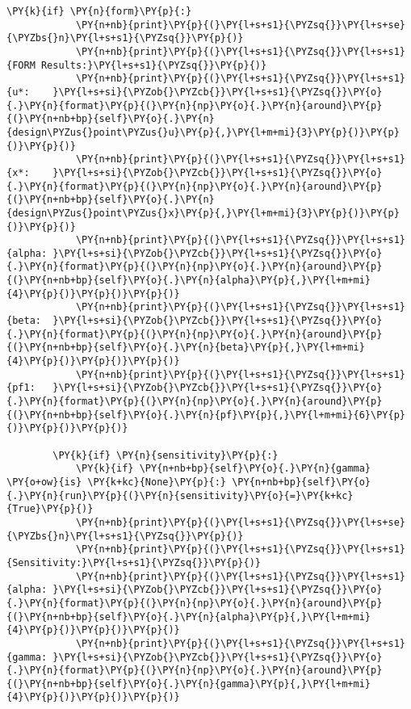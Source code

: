 \begin{tcolorbox}[breakable, size=fbox, boxrule=1pt, pad at break*=1mm,colback=cellbackground, colframe=cellborder]
\begin{Verbatim}[commandchars=\\\{\}]
        \PY{k}{if} \PY{n}{form}\PY{p}{:}
            \PY{n+nb}{print}\PY{p}{(}\PY{l+s+s1}{\PYZsq{}}\PY{l+s+se}{\PYZbs{}n}\PY{l+s+s1}{\PYZsq{}}\PY{p}{)}
            \PY{n+nb}{print}\PY{p}{(}\PY{l+s+s1}{\PYZsq{}}\PY{l+s+s1}{FORM Results:}\PY{l+s+s1}{\PYZsq{}}\PY{p}{)}
            \PY{n+nb}{print}\PY{p}{(}\PY{l+s+s1}{\PYZsq{}}\PY{l+s+s1}{u*:    }\PY{l+s+si}{\PYZob{}\PYZcb{}}\PY{l+s+s1}{\PYZsq{}}\PY{o}{.}\PY{n}{format}\PY{p}{(}\PY{n}{np}\PY{o}{.}\PY{n}{around}\PY{p}{(}\PY{n+nb+bp}{self}\PY{o}{.}\PY{n}{design\PYZus{}point\PYZus{}u}\PY{p}{,}\PY{l+m+mi}{3}\PY{p}{)}\PY{p}{)}\PY{p}{)}
            \PY{n+nb}{print}\PY{p}{(}\PY{l+s+s1}{\PYZsq{}}\PY{l+s+s1}{x*:    }\PY{l+s+si}{\PYZob{}\PYZcb{}}\PY{l+s+s1}{\PYZsq{}}\PY{o}{.}\PY{n}{format}\PY{p}{(}\PY{n}{np}\PY{o}{.}\PY{n}{around}\PY{p}{(}\PY{n+nb+bp}{self}\PY{o}{.}\PY{n}{design\PYZus{}point\PYZus{}x}\PY{p}{,}\PY{l+m+mi}{3}\PY{p}{)}\PY{p}{)}\PY{p}{)}
            \PY{n+nb}{print}\PY{p}{(}\PY{l+s+s1}{\PYZsq{}}\PY{l+s+s1}{alpha: }\PY{l+s+si}{\PYZob{}\PYZcb{}}\PY{l+s+s1}{\PYZsq{}}\PY{o}{.}\PY{n}{format}\PY{p}{(}\PY{n}{np}\PY{o}{.}\PY{n}{around}\PY{p}{(}\PY{n+nb+bp}{self}\PY{o}{.}\PY{n}{alpha}\PY{p}{,}\PY{l+m+mi}{4}\PY{p}{)}\PY{p}{)}\PY{p}{)}
            \PY{n+nb}{print}\PY{p}{(}\PY{l+s+s1}{\PYZsq{}}\PY{l+s+s1}{beta:  }\PY{l+s+si}{\PYZob{}\PYZcb{}}\PY{l+s+s1}{\PYZsq{}}\PY{o}{.}\PY{n}{format}\PY{p}{(}\PY{n}{np}\PY{o}{.}\PY{n}{around}\PY{p}{(}\PY{n+nb+bp}{self}\PY{o}{.}\PY{n}{beta}\PY{p}{,}\PY{l+m+mi}{4}\PY{p}{)}\PY{p}{)}\PY{p}{)}
            \PY{n+nb}{print}\PY{p}{(}\PY{l+s+s1}{\PYZsq{}}\PY{l+s+s1}{pf1:   }\PY{l+s+si}{\PYZob{}\PYZcb{}}\PY{l+s+s1}{\PYZsq{}}\PY{o}{.}\PY{n}{format}\PY{p}{(}\PY{n}{np}\PY{o}{.}\PY{n}{around}\PY{p}{(}\PY{n+nb+bp}{self}\PY{o}{.}\PY{n}{pf}\PY{p}{,}\PY{l+m+mi}{6}\PY{p}{)}\PY{p}{)}\PY{p}{)}

        \PY{k}{if} \PY{n}{sensitivity}\PY{p}{:}
            \PY{k}{if} \PY{n+nb+bp}{self}\PY{o}{.}\PY{n}{gamma} \PY{o+ow}{is} \PY{k+kc}{None}\PY{p}{:} \PY{n+nb+bp}{self}\PY{o}{.}\PY{n}{run}\PY{p}{(}\PY{n}{sensitivity}\PY{o}{=}\PY{k+kc}{True}\PY{p}{)}
            \PY{n+nb}{print}\PY{p}{(}\PY{l+s+s1}{\PYZsq{}}\PY{l+s+se}{\PYZbs{}n}\PY{l+s+s1}{\PYZsq{}}\PY{p}{)}
            \PY{n+nb}{print}\PY{p}{(}\PY{l+s+s1}{\PYZsq{}}\PY{l+s+s1}{Sensitivity:}\PY{l+s+s1}{\PYZsq{}}\PY{p}{)}
            \PY{n+nb}{print}\PY{p}{(}\PY{l+s+s1}{\PYZsq{}}\PY{l+s+s1}{alpha: }\PY{l+s+si}{\PYZob{}\PYZcb{}}\PY{l+s+s1}{\PYZsq{}}\PY{o}{.}\PY{n}{format}\PY{p}{(}\PY{n}{np}\PY{o}{.}\PY{n}{around}\PY{p}{(}\PY{n+nb+bp}{self}\PY{o}{.}\PY{n}{alpha}\PY{p}{,}\PY{l+m+mi}{4}\PY{p}{)}\PY{p}{)}\PY{p}{)}
            \PY{n+nb}{print}\PY{p}{(}\PY{l+s+s1}{\PYZsq{}}\PY{l+s+s1}{gamma: }\PY{l+s+si}{\PYZob{}\PYZcb{}}\PY{l+s+s1}{\PYZsq{}}\PY{o}{.}\PY{n}{format}\PY{p}{(}\PY{n}{np}\PY{o}{.}\PY{n}{around}\PY{p}{(}\PY{n+nb+bp}{self}\PY{o}{.}\PY{n}{gamma}\PY{p}{,}\PY{l+m+mi}{4}\PY{p}{)}\PY{p}{)}\PY{p}{)}
\end{Verbatim}
\end{tcolorbox}

